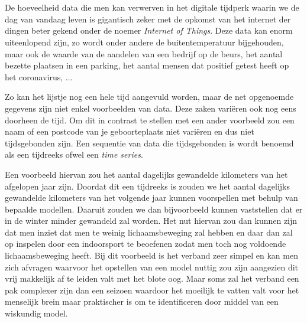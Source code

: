 
\chapter{}
\label{ch:inleiding}


De hoeveelheid data die men kan verwerven in het digitale tijdperk waarin we de dag van vandaag leven is gigantisch zeker met de opkomst van het internet der dingen beter gekend onder de noemer \textit{Internet of Things}. Deze data kan enorm uiteenlopend zijn, zo wordt onder andere de buitentemperatuur bijgehouden, maar ook de waarde van de aandelen van een bedrijf op de beurs, het aantal bezette plaatsen in een parking, het aantal mensen dat positief getest heeft op het coronavirus, ...

Zo kan het lijstje nog een hele tijd aangevuld worden, maar de net opgenoemde gegevens zijn niet enkel voorbeelden van data. Deze zaken vari\"{e}ren ook nog eens doorheen de tijd. Om dit in contrast te stellen met een ander voorbeeld zou een naam of een postcode van je geboorteplaats niet vari\"{e}ren en dus niet tijdsgebonden zijn. Een sequentie van data die tijdsgebonden is wordt benoemd als een tijdreeks ofwel een \textit{time series}. 

Een voorbeeld hiervan zou het aantal dagelijks gewandelde kilometers van het afgelopen jaar zijn. Doordat dit een tijdreeks is zouden we het aantal dagelijks gewandelde kilometers van het volgende jaar kunnen voorspellen met behulp van bepaalde modellen. Daaruit zouden we dan bijvoorbeeld kunnen vaststellen dat er in de winter minder gewandeld zal worden. Het nut hiervan zou dan kunnen zijn dat men inziet dat men te weinig lichaamsbeweging zal hebben en daar dan zal op inspelen door een indoorsport te beoefenen zodat men toch nog voldoende lichaamsbeweging heeft. Bij dit voorbeeld is het verband zeer simpel en kan men zich afvragen waarvoor het opstellen van een model nuttig zou zijn aangezien dit vrij makkelijk af te leiden valt met het blote oog. Maar soms zal het verband een pak complexer zijn dan een seizoen waardoor het moeilijk te vatten valt voor het menselijk brein maar praktischer is om te identificeren door middel van een wiskundig model. 

